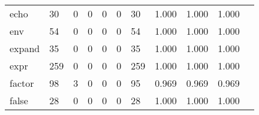 \begin{longtable}{lp{1.2cm}p{1.2cm}p{1.2cm}p{1.2cm}p{1.2cm}p{1.2cm}p{1.2cm}p{1.2cm}p{1.2cm}p{1.2cm}}
echo      &                                    30 &                                                  0 &                                                  0 &                                                  0 &                                                  0 &                                                 30 &                                         1.000 &                                              1.000 &                                              1.000 \\
env       &                                    54 &                                                  0 &                                                  0 &                                                  0 &                                                  0 &                                                 54 &                                         1.000 &                                              1.000 &                                              1.000 \\
expand    &                                    35 &                                                  0 &                                                  0 &                                                  0 &                                                  0 &                                                 35 &                                         1.000 &                                              1.000 &                                              1.000 \\
expr      &                                   259 &                                                  0 &                                                  0 &                                                  0 &                                                  0 &                                                259 &                                         1.000 &                                              1.000 &                                              1.000 \\
factor    &                                    98 &                                                  3 &                                                  0 &                                                  0 &                                                  0 &                                                 95 &                                         0.969 &                                              0.969 &                                              0.969 \\
false     &                                    28 &                                                  0 &                                                  0 &                                                  0 &                                                  0 &                                                 28 &                                         1.000 &                                              1.000 &                                              1.000 \\

\end{longtable}
